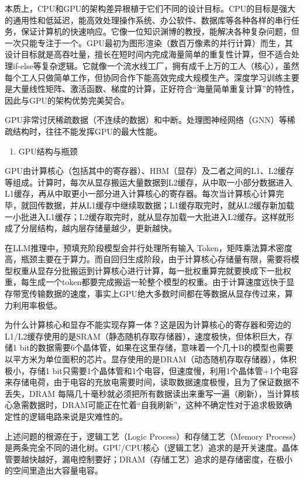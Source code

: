 本质上，CPU和GPU的架构差异根植于它们不同的设计目标。CPU的目标是强大的通用性和低延迟，能高效处理操作系统、办公软件、数据库等各种各样的串行任务，保证计算机的快速响应。它像一位知识渊博的教授，能解决各种复杂问题，但一次只能专注于一个。GPU最初为图形渲染（数百万像素的并行计算）而生，其设计目标就是高吞吐量，擅长在短时间内完成海量简单的重复性计算，但不适合处理if-else等复杂逻辑。它就像一个流水线工厂，拥有成千上万的工人（核心），虽然每个工人只做简单工作，但协同合作下能高效完成大规模生产。深度学习训练主要是大量线性矩阵、激活函数、梯度的计算，正好符合``海量简单重复计算''的特性，因此与GPU的架构优势完美契合。

GPU非常讨厌稀疏数据（不连续的数据）和中断。处理图神经网络（GNN）等稀疏结构时，往往不能发挥GPU的最大性能。

\begin{enumerate}
\def\labelenumi{\arabic{enumi}.}
\setcounter{enumi}{1}
\tightlist
\item
  GPU结构与瓶颈
\end{enumerate}

GPU由计算核心（包括其中的寄存器）、HBM（显存）及二者之间的L1、L2缓存等组成。计算时，每次从显存搬运大量数据到L2缓存，从中取一小部分数据进入L1缓存，再从中取更小一部分进入计算核心的寄存器。每次当计算核心计算完毕，就回传数据，并从L1缓存中继续取数据；L1缓存取完时，就从L2缓存新加载一小批进入L1缓存；L2缓存取完时，就从显存加载一大批进入L2缓存。这样就形成了分层结构，越内层存储量越少，更新越快。

在LLM推理中，预填充阶段模型会并行处理所有输入 Token，矩阵乘法算术密度高，瓶颈主要在于算力。而自回归生成阶段，由于计算核心存储量有限，需要将模型权重从显存分批搬运到计算核心进行计算，每一批权重算完就要换成下一批权重，每生成一个token都要完成搬运一轮整个模型的权重。由于计算速度远快于显存带宽传输数据的速度，事实上GPU绝大多数时间都在等数据从显存传过来，算力利用率极低。

为什么计算核心和显存不能实现存算一体？这是因为计算核心的寄存器和旁边的L1/L2缓存使用的是SRAM（静态随机存取存储器），速度极快，但体积巨大，存储1 bit的数据需要6个晶体管，如果在这里存储，意味着一个几十B的模型也需要以平方米为单位面积的芯片。显存使用的是DRAM（动态随机存取存储器），体积极小，存储1 bit只需要1个晶体管和1个电容，但速度慢，利用1个晶体管+1个电容来存储电荷，由于电容的充放电需要时间，读取数据速度极慢，且为了保证数据不丢失，DRAM 每隔几十毫秒就必须把所有数据读出来重写一遍（刷新），当计算核心急需数据时，DRAM可能正在忙着``自我刷新''，这种不确定性对于追求极致确定性的逻辑电路来说是灾难性的。

上述问题的根源在于，逻辑工艺（Logic Process）和存储工艺（Memory Process）是两条完全不同的进化树。GPU/CPU核心（逻辑工艺）追求的是开关速度。晶体管要越快越好，漏电控制要好；DRAM（存储工艺）追求的是存储密度，在极小的空间里造出大容量电容。

